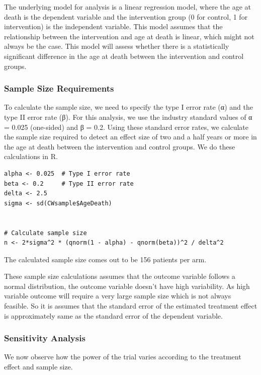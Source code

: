 \documentclass[
]{article}
\begin{document}
The underlying model for analysis is a linear regression model, where
the age at death is the dependent variable and the intervention group (0
for control, 1 for intervention) is the independent variable. This model
assumes that the relationship between the intervention and age at death
is linear, which might not always be the case. This model will assess
whether there is a statistically significant difference in the age at
death between the intervention and control groups.

\hypertarget{sample-size-requirements}{%
\subsubsection{Sample Size
Requirements}\label{sample-size-requirements}}

To calculate the sample size, we need to specify the type I error rate
(α) and the type II error rate (β). For this analysis, we use the
industry standard values of α = 0.025 (one-sided) and β = 0.2. Using
these standard error rates, we calculate the sample size required to
detect an effect size of two and a half years or more in the age at
death between the intervention and control groups. We do these
calculations in R.

\begin{verbatim}
alpha <- 0.025  # Type I error rate
beta <- 0.2     # Type II error rate
delta <- 2.5   
sigma <- sd(CWsample$AgeDeath)


# Calculate sample size
n <- 2*sigma^2 * (qnorm(1 - alpha) - qnorm(beta))^2 / delta^2
\end{verbatim}

The calculated sample size comes out to be 156 patients per arm.

These sample size calculations assumes that the outcome variable follows
a normal distribution, the outcome variable doesn't have high
variability. As high variable outcome will require a very large sample
size which is not always feasible. So it is assumes that the standard
error of the estimated treatment effect is approximately same as the
standard error of the dependent variable.

\hypertarget{sensitivity-analysis}{%
\subsubsection{Sensitivity Analysis}\label{sensitivity-analysis}}

We now observe how the power of the trial varies according to the
treatment effect and sample size.
\end{document}
